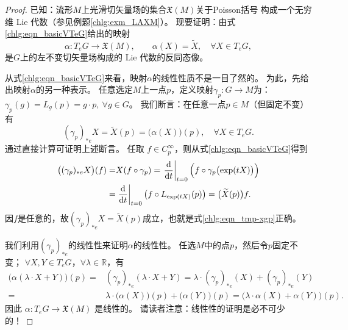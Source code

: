 \begin{proof}
    已知：流形$M$上光滑切矢量场的集合$\mathfrak{X}(M)$关于Poisson括号
    构成一个无穷维 Lie 代数（参见例题\ref{chlg:exm_LAXM}）。
    现要证明：由式\eqref{chlg:eqn_basicVTeG}给出的映射
    \begin{equation}
        \alpha: T_e G \rightarrow \mathfrak{X}(M),\qquad
        \alpha(X)=\widetilde{X}, \quad \forall X \in T_e G,
    \end{equation}
    是$G$上的左不变切矢量场构成的 Lie 代数的反同态像。
    
    从式\eqref{chlg:eqn_basicVTeG}来看，映射$\alpha$的线性性质不是一目了然的。
    为此，先给出映射$\alpha$的另一种表示。
    任意选定$M$上一点$p$，定义映射$\gamma_p: G \rightarrow M$为：
    $\gamma_p(g)=L_g(p)=g\cdot p, \ \forall g \in G $。
    我们断言：在任意一点$p \in M$（但固定不变）有
    \begin{equation}\label{chlg:eqn_tmp-xgp}
        (\gamma_p)_{*e} X =\widetilde{X}(p)=\bigl(\alpha(X)\bigr)(p), \quad \forall X \in T_e G .
    \end{equation}
    通过直接计算可证明上述断言。
    任取 $f \in C_p^{\infty}$，则从式\eqref{chlg:eqn_basicVTeG}得到
    \begin{align*}
        \bigl((\gamma_p)_{*e} X\bigr)(f)=& X(f \circ \gamma_p) 
        = \left.\frac{\mathrm{d}}{\mathrm{d} t}\right|_{t=0} \Bigl(f \circ \gamma_p\bigl(\exp (t X)\bigr)\Bigr) \\
        = & \left.\frac{\mathrm{d}}{\mathrm{d} t}\right|_{t=0}\left(f \circ L_{\exp (t  X)}(p)\right) 
        =  \bigl(\widetilde{X}(p)\bigr) f.
    \end{align*}
    因$f$是任意的，故$(\gamma_p)_{*e} X=\widetilde{X}(p)$成立，也就是式\eqref{chlg:eqn_tmp-xgp}正确。
    
    我们利用$(\gamma_p)_{*e}$的线性性来证明$\alpha$的线性性。
    任选$M$中的点$p$，然后令$p$固定不变；
    $\forall X, Y \in T_e G$，$\forall \lambda \in \mathbb{R}$，有
    \begin{align*}
        \bigl(\alpha(\lambda \cdot X+Y)\bigr)(p)=& (\gamma_p)_{*e}(\lambda \cdot X+Y) 
        =  \lambda \cdot (\gamma_p)_{*e}(X)+(\gamma_p)_{*e}(Y) \\
        = & \lambda \cdot \bigl(\alpha(X)\bigr)(p)+\bigl(\alpha(Y)\bigr)(p) 
        =  \bigl(\lambda \cdot \alpha(X)+\alpha(Y)\bigr)(p). 
    \end{align*}
    因此 $\alpha: T_e G \rightarrow \mathfrak{X}(M)$ 是线性的。
    请读者注意：线性性的证明是必不可少的！
    

\end{proof}

